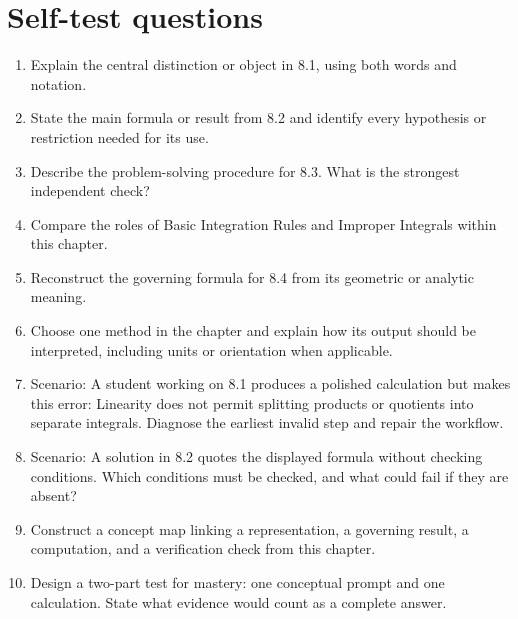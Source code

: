 \documentclass[11pt]{article}
\begin{document}
\section{Self-test questions}
\begin{enumerate}
\item Explain the central distinction or object in 8.1, using both words and notation.
\item State the main formula or result from 8.2 and identify every hypothesis or restriction needed for its use.
\item Describe the problem-solving procedure for 8.3. What is the strongest independent check?
\item Compare the roles of Basic Integration Rules and Improper Integrals within this chapter.
\item Reconstruct the governing formula for 8.4 from its geometric or analytic meaning.
\item Choose one method in the chapter and explain how its output should be interpreted, including units or orientation when applicable.
\item Scenario: A student working on 8.1 produces a polished calculation but makes this error: Linearity does not permit splitting products or quotients into separate integrals. Diagnose the earliest invalid step and repair the workflow.
\item Scenario: A solution in 8.2 quotes the displayed formula without checking conditions. Which conditions must be checked, and what could fail if they are absent?
\item Construct a concept map linking a representation, a governing result, a computation, and a verification check from this chapter.
\item Design a two-part test for mastery: one conceptual prompt and one calculation. State what evidence would count as a complete answer.
\end{enumerate}

\end{document}
